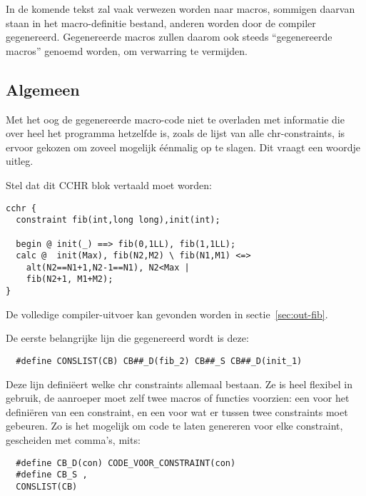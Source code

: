 In de komende tekst zal vaak verwezen worden naar macros, sommigen daarvan staan in het macro-definitie bestand, anderen worden door de compiler gegenereerd. Gegenereerde macros zullen daarom ook steeds ``gegenereerde macros'' genoemd worden, om verwarring te vermijden.

\subsection{Algemeen} \label{sec:gencode-alg}

Met het oog de gegenereerde macro-code niet te overladen met informatie die over heel het programma hetzelfde is, zoals de lijst van alle chr-constraints, is ervoor gekozen om zoveel mogelijk \'e\'enmalig op te slagen. Dit vraagt een woordje uitleg.

Stel dat dit CCHR blok vertaald moet worden: \begin{Verbatim}
cchr {
  constraint fib(int,long long),init(int);

  begin @ init(_) ==> fib(0,1LL), fib(1,1LL);
  calc @  init(Max), fib(N2,M2) \ fib(N1,M1) <=>
    alt(N2==N1+1,N2-1==N1), N2<Max |
    fib(N2+1, M1+M2);
}
\end{Verbatim}
De volledige compiler-uitvoer kan gevonden worden in sectie~\ref{sec:out-fib}.

De eerste belangrijke lijn die gegenereerd wordt is deze: 
\begin{Verbatim}
  #define CONSLIST(CB) CB##_D(fib_2) CB##_S CB##_D(init_1)
\end{Verbatim}
Deze lijn defini\"eert welke chr constraints allemaal bestaan. Ze is heel flexibel in gebruik, de aanroeper moet zelf twee macros of functies voorzien: een voor het defini\"eren van een constraint, en een voor wat er tussen twee constraints moet gebeuren. Zo is het mogelijk om code te laten genereren voor elke constraint, gescheiden met comma's, mits: \begin{Verbatim}
  #define CB_D(con) CODE_VOOR_CONSTRAINT(con)
  #define CB_S ,
  CONSLIST(CB)
\end{Verbatim}

